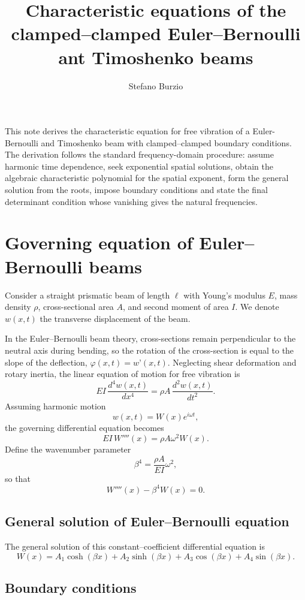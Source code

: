 \documentclass[11pt,a4paper]{article}
\title{Characteristic equations of the clamped--clamped Euler--Bernoulli ant Timoshenko beams}
\author{Stefano Burzio}
\date{}
\begin{document}
\maketitle

This note derives the characteristic equation for free vibration of a Euler-Bernoulli and Timoshenko beam with clamped--clamped boundary conditions. The derivation follows the standard frequency-domain procedure: assume harmonic time dependence, seek exponential spatial solutions, obtain the algebraic characteristic polynomial for the spatial exponent, form the general solution from the roots, impose boundary conditions and state the final determinant condition whose vanishing gives the natural frequencies.

\section{Governing equation of Euler--Bernoulli beams}

Consider a straight prismatic beam of length $\ell$ with Young’s modulus $E$, mass density $\rho$, cross-sectional area $A$, and second moment of area $I$. We denote $w(x,t)$ the transverse displacement of the beam.

In the Euler–Bernoulli beam theory, cross-sections remain perpendicular to the neutral axis during bending, so the rotation of the cross-section is equal to the slope of the deflection, $\varphi(x,t) = w’(x,t)$. Neglecting shear deformation and rotary inertia, the linear equation of motion for free vibration is
\[
      EI\,\frac{d^4 w(x,t)}{dx^4} = \rho A\,\frac{d^2 w(x,t)}{dt^2}.
\]
Assuming harmonic motion
\[
      w(x,t) = W(x)e^{i\omega t},
\]
the governing differential equation becomes
\[
      EI\,W''''(x) = \rho A \omega^2 W(x).
\]
Define the wavenumber parameter
\[
      \beta^{4} = \frac{\rho A }{EI}\omega^2,
\]
so that
\[
      W''''(x) - \beta^{4} W(x) = 0.
\]

\subsection{General solution of Euler--Bernoulli equation}

The general solution of this constant--coefficient differential equation is
\[
      W(x) = A_1\cosh(\beta x) + A_2\sinh(\beta x)
      + A_3\cos(\beta x) + A_4\sin(\beta x).
\]

\subsection{Boundary conditions}
\end{document}
